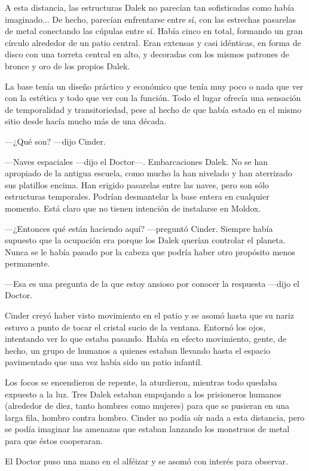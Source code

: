 A esta distancia, las estructuras Dalek no parecían tan sofisticadas como había imaginado... De hecho, parecían enfrentarse entre sí, con las estrechas pasarelas de metal conectando las cúpulas entre sí. Había cinco en total, formando un gran círculo alrededor de un patio central. Eran extensas y casi idénticas, en forma de disco con una torreta central en alto, y decoradas con los mismos patrones de bronce y oro de los propios Dalek.

La base tenía un diseño práctico y económico que tenía muy poco o nada que ver con la estética y todo que ver con la función. Todo el lugar ofrecía una sensación de temporalidad y transitoriedad, pese al hecho de que había estado en el mismo sitio desde hacía mucho más de una década.



—¿Qué son? —dijo Cinder.

—Naves espaciales —dijo el Doctor—. Embarcaciones Dalek. No se han apropiado de la antigua escuela, como mucho la han nivelado y han aterrizado sus platillos encima. Han erigido pasarelas entre las naves, pero son sólo estructuras temporales. Podrían desmantelar la base entera en cualquier momento. Está claro que no tienen intención de instalarse en Moldox.

—¿Entonces qué están haciendo aquí? —preguntó Cinder. Siempre había supuesto que la ocupación era porque los Dalek querían controlar el planeta. Nunca se le había pasado por la cabeza que podría haber otro propósito menos permanente.

—Esa es una pregunta de la que estoy ansioso por conocer la respuesta —dijo el Doctor.

Cinder creyó haber visto movimiento en el patio y se asomó hasta que su nariz estuvo a punto de tocar el cristal sucio de la ventana. Entornó los ojos, intentando ver lo que estaba pasando. Había en efecto movimiento, gente, de hecho, un grupo de humanos a quienes estaban llevando hasta el espacio pavimentado que una vez había sido un patio infantil.

Los focos se encendieron de repente, la aturdieron, mientras todo quedaba expuesto a la luz. Tres Dalek estaban empujando a los prisioneros humanos (alrededor de diez, tanto hombres como mujeres) para que se pusieran en una larga fila, hombro contra hombro. Cinder no podía oír nada a esta distancia, pero se podía imaginar las amenazas que estaban lanzando los monstruos de metal para que éstos cooperaran.

El Doctor puso una mano en el alféizar y se asomó con interés para observar.

